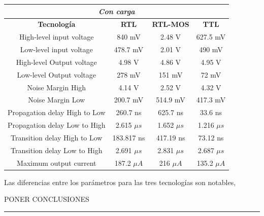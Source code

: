 \begin{table}[H]
\centering
\begin{tabular}{c|ccc}
\hline
\multicolumn{4}{|c|}{\textit{Con carga}}                                                                         \\ \hline
\multicolumn{1}{|c|}{\textbf{Tecnología}} & \textbf{RTL}  & \textbf{RTL-MOS} & \multicolumn{1}{c|}{\textbf{TTL}} \\ \hline
High-level input voltage                  & 840 mV        & 2.48 V           & 627.5 mV                          \\
Low-level input voltage                   & 478.7 mV      & 2.01 V         &    490 mV                         \\
High-level Output voltage                 & 4.98 V        & 4.86 V          & 4.95 V                            \\
Low-level Output voltage                  & 278 mV        & 151 mV           & 72 mV                             \\
Noise Margin High                         & 4.14 V        & 2.52 V           & 4.32 V                            \\
Noise Margin Low                          & 200.7 mV      & 514.9 mV         & 417.3 mV                          \\
Propagation delay High to Low             & 260.7 ns      & 625.7 ns         & 33.6 ns \\
Propagation delay Low to High             & 2.615 $\mu s$ & 1.652 $\mu s$    & 1.216 $\mu s$                     \\
Transition delay High to Low              & 183.817 ns    & 417.19 ns        & 73.12 ns                          \\
Transition delay Low to High              & 2.691 $\mu s$ & 2.831 $\mu s$    & 2.687 $\mu s$                     \\
Maximum output current                    &  187.2 $\mu A$             &     216 $\mu A$             &   135.2 $\mu A$       \\
\hline                        
\end{tabular}
\end{table}
 

Las diferencias entre los parámetros para las tres tecnologías son notables,
{\begin{center}\color{red} \begin{huge}
PONER CONCLUSIONES \end{huge} \rule{\linewidth}{0.5mm}\end{center} }